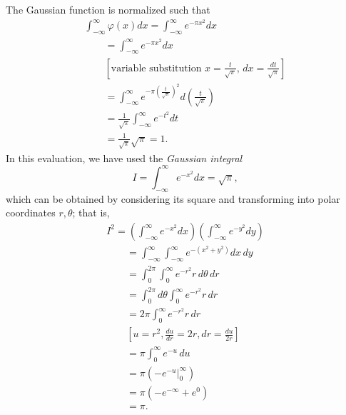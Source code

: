 The Gaussian function is normalized such that
\begin{equation}
\begin{split}
\int_{-\infty}^{ \infty} \varphi (x)dx =
\int_{-\infty}^{ \infty} e^{-\pi x^2}dx \\
\qquad
= \int_{-\infty}^{ \infty}  e^{-\pi x^2}dx   \\
\qquad [\textrm{variable substitution } x = \frac{t}{\sqrt{\pi}}, \, dx = \frac{dt}{\sqrt{\pi}} ]\\
\qquad
= \int_{-\infty}^{ \infty}  e^{-\pi \left(\frac{t}{\sqrt{\pi}}\right)^2}d\left(\frac{t}{\sqrt{\pi}}\right)  \\
\qquad
=\frac{1}{ \sqrt{\pi} } \int_{-\infty}^{ \infty}  e^{- t^2}dt  \\
\qquad
=\frac{1}{\sqrt{\pi} } \sqrt{\pi} = 1.
\end{split}
\end{equation}
In this evaluation, we have used the {\em Gaussian integral}
\begin{equation}
I= \int_{-\infty}^{ \infty}  e^{-x^2}dx=   \sqrt{\pi},
\end{equation}
which can be obtained by considering its square and transforming into polar coordinates $r,\theta$; that  is,
\begin{equation}
\begin{split}
I^2 =
\left(\int_{-\infty}^{ \infty}  e^{-x^2}dx\right)\left(\int_{-\infty}^{ \infty}  e^{-y^2}dy\right)  \\
\qquad =
 \int_{-\infty}^{ \infty} \int_{-\infty}^{ \infty}   e^{-\left(x^2+y^2\right)}dx \,dy   \\
\qquad =
 \int_{0}^{2\pi } \int_{0}^{ \infty}   e^{-r^2}r \, d\theta \,dr   \\
\qquad =
 \int_{0}^{2\pi }  d\theta \int_{0}^{ \infty}   e^{-r^2}r  \,dr   \\
\qquad =
 2\pi   \int_{0}^{ \infty}   e^{-r^2}r  \,dr   \\
\qquad
\left[
u=r^2, \frac{du}{dr} =2r, dr =  \frac{du}{2r}
\right]   \\
\qquad =
  \pi   \int_{0}^{ \infty}   e^{-u}  \,du  \\
\qquad =
  \pi     \left( \left. - e^{-u} \right|_{0}^{ \infty} \right)  \\
\qquad =
  \pi     \left( - e^{-\infty} + e^{0} \right)  \\
\qquad =
  \pi .
\end{split}
\label{2012-m-ch-di-gi2}
\end{equation}

